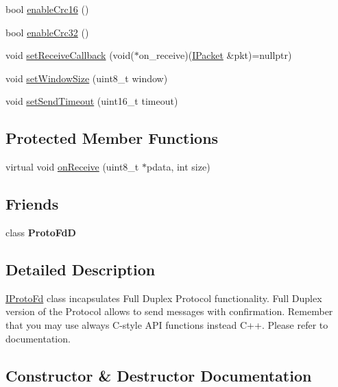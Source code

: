 \begin{DoxyCompactItemize}
\item 
bool \hyperlink{classTiny_1_1IProtoFd_a8b57afdb66434aa35409af34b04e1db9}{enable\+Crc16} ()
\item 
bool \hyperlink{classTiny_1_1IProtoFd_a1bf1f5211ae3a49caf73ee3de3bb9247}{enable\+Crc32} ()
\item 
void \hyperlink{classTiny_1_1IProtoFd_a70aa7c85b5fe83513eebb63b803d5825}{set\+Receive\+Callback} (void($\ast$on\+\_\+receive)(\hyperlink{classTiny_1_1IPacket}{I\+Packet} \&pkt)=nullptr)
\item 
void \hyperlink{classTiny_1_1IProtoFd_adddcc24bf1ef40d39c944679a97c1ec4}{set\+Window\+Size} (uint8\+\_\+t window)
\item 
void \hyperlink{classTiny_1_1IProtoFd_a2492655abda41d5b0fbda6f0e1c6badc}{set\+Send\+Timeout} (uint16\+\_\+t timeout)
\end{DoxyCompactItemize}
\subsection*{Protected Member Functions}
\begin{DoxyCompactItemize}
\item 
virtual void \hyperlink{classTiny_1_1IProtoFd_a795b41c969708964cd4646580af1c3ab}{on\+Receive} (uint8\+\_\+t $\ast$pdata, int size)
\end{DoxyCompactItemize}
\subsection*{Friends}
\begin{DoxyCompactItemize}
\item 
\mbox{\label{classTiny_1_1IProtoFd_ac4b680549c66e93cb1996fadcf86d724}} 
class {\bfseries Proto\+FdD}
\end{DoxyCompactItemize}


\subsection{Detailed Description}
\hyperlink{classTiny_1_1IProtoFd}{I\+Proto\+Fd} class incapsulates Full Duplex Protocol functionality. Full Duplex version of the Protocol allows to send messages with confirmation. Remember that you may use always C-\/style A\+PI functions instead C++. Please refer to documentation. 

\subsection{Constructor \& Destructor Documentation}
\mbox{\label{classTiny_1_1IProtoFd_a65976c6faaf41504b7c15036edc054cf}} 
